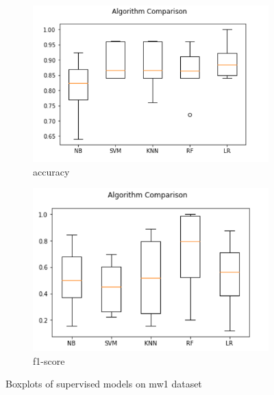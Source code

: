 \begin{figure}[h!]
  \centering
  \begin{subfigure}[b]{0.4\linewidth}
    \includegraphics[width=\linewidth]{report/mw1.png}
    \caption{accuracy}
  \end{subfigure}
  \begin{subfigure}[b]{0.4\linewidth}
    \includegraphics[width=\linewidth]{report/mw1_f.png}
    \caption{f1-score}
  \end{subfigure}
  \caption{Boxplots of supervised models on mw1 dataset}
\end{figure}

\pagebreak

